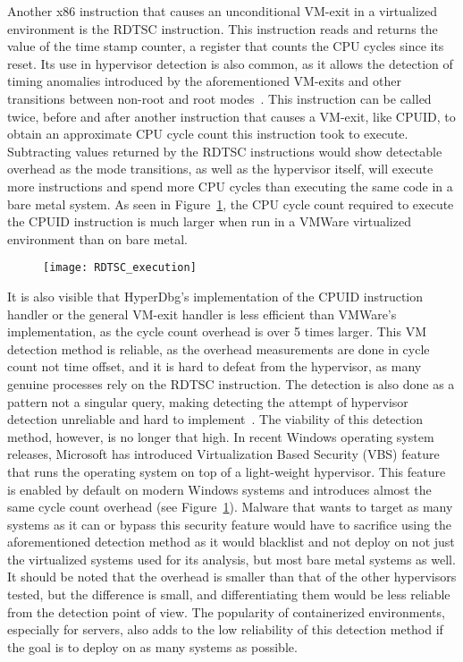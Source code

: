 Another x86 instruction that causes an unconditional VM-exit in a virtualized environment is the RDTSC instruction. This instruction reads and returns the value of the time stamp counter, 
a register that counts the CPU cycles since its reset. Its use in hypervisor detection is also common, as it allows the detection of timing anomalies introduced by the aforementioned VM-exits 
and other transitions between non-root and root modes~\cite{hyperdbg-transparency}. This instruction can be called twice, before and after another instruction that causes a VM-exit, like CPUID, to obtain an approximate CPU
cycle count this instruction took to execute. Subtracting values returned by the RDTSC instructions would show detectable overhead as the mode transitions, as well as the hypervisor itself, 
will execute more instructions and spend more CPU cycles than executing the same code in a bare metal system. 
As seen in Figure~\ref{fig:rdtsc_overhead}, the CPU cycle count required to execute the CPUID instruction is much larger when run in a VMWare virtualized environment than on bare metal. 
\begin{figure}[tbp]
    \texttt{[image: RDTSC\_execution]} %
    \label{fig:rdtsc_overhead}
\end{figure}

It is also visible that HyperDbg's implementation of the CPUID instruction handler or the general VM-exit handler is less efficient than VMWare's implementation, as the cycle count overhead is over 5 times larger. 
This VM detection method is reliable, as the overhead measurements are done in cycle count not time offset, and it is hard to defeat from the hypervisor, as many genuine processes rely on the RDTSC 
instruction. The detection is also done as a pattern not a singular query, making detecting the attempt of hypervisor detection unreliable and hard to implement~\cite{hypervisor-detection-timing-attacks}. 
The viability of this detection method, however, is no longer that high. In recent Windows operating system releases, Microsoft has introduced Virtualization Based Security (VBS) feature~\cite{windows-vbs} 
that runs the operating system on top of a light-weight hypervisor. This feature is enabled by default on modern Windows systems and introduces almost the same cycle count overhead (see Figure~\ref{fig:rdtsc_overhead}). 
Malware that wants to target as many systems as it can or bypass this security feature would have to sacrifice using the aforementioned detection method as it would blacklist and not deploy on not just the virtualized systems used for its analysis, 
but most bare metal systems as well. It should be noted that the overhead is smaller than that of the other hypervisors tested, but the difference is small, and differentiating them would be less reliable from the detection point of view.
The popularity of containerized environments, especially for servers, also adds to the low reliability of this detection method if the goal is to deploy on as many systems as possible.

